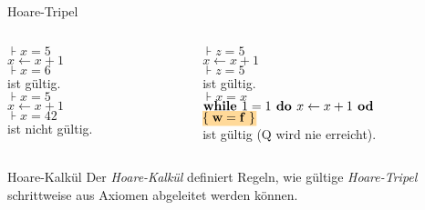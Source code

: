 \begin{frame}{Hoare-Tripel}
	\begin{Beispiel}
		\begin{columns}[T] 
			\begin{column}[T]{.4\textwidth} 
				$\assert{x = 5}$ \\
				$x \gets x + 1$ \\
				$\assert{x = 6}$ \\
				ist gültig.  \\
				
				\bigskip
				$\assert{x = 5}$ \\
				$x \gets x + 1$ \\
				$\assert{x = 42}$ \\
				ist nicht gültig.
			\end{column}
			\begin{column}[T]{.4\textwidth} 
				\pause
				$\assert{z = 5}$ \\
				$x \gets x + 1$ \\
				$\assert{z = 5}$ \\
				ist gültig.  \\
				
				
				\ifnum{} %
				\else
				\bigskip
				$\assert{x = x}$ \\
				$\textbf{while } 1 = 1 \textbf{ do } x \gets x + 1 \textbf{ od}$ \\
				$\assert{\W = \F}$ \\
				ist gültig (Q wird nie erreicht).
				\fi
			\end{column}
		\end{columns}
	\end{Beispiel}
	\medskip
	\pause
	\begin{block}{Hoare-Kalkül}
		Der \emph{Hoare-Kalkül} definiert Regeln, wie gültige \emph{Hoare-Tripel} schrittweise aus Axiomen abgeleitet werden können.
	\end{block}
\end{frame}


